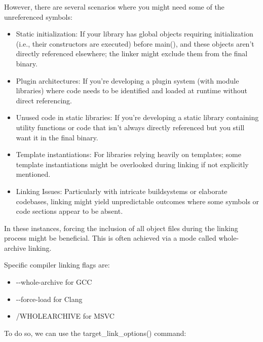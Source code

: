 However, there are several scenarios where you might need some of the unreferenced symbols:

\begin{itemize}
\item
Static initialization: If your library has global objects requiring initialization (i.e., their constructors are executed) before main(), and these objects aren’t directly referenced elsewhere; the linker might exclude them from the final binary.

\item
Plugin architectures: If you’re developing a plugin system (with module libraries) where code needs to be identified and loaded at runtime without direct referencing.

\item
Unused code in static libraries: If you’re developing a static library containing utility functions or code that isn’t always directly referenced but you still want it in the final binary.

\item
Template instantiations: For libraries relying heavily on templates; some template instantiations might be overlooked during linking if not explicitly mentioned.

\item
Linking Issues: Particularly with intricate buildsystems or elaborate codebases, linking might yield unpredictable outcomes where some symbols or code sections appear to be absent.
\end{itemize}

In these instances, forcing the inclusion of all object files during the linking process might be beneficial. This is often achieved via a mode called whole-archive linking.

Specific compiler linking flags are:

\begin{itemize}
\item
-{}-whole-archive for GCC

\item
-{}-force-load for Clang

\item
/WHOLEARCHIVE for MSVC
\end{itemize}

To do so, we can use the target\_link\_options() command:


